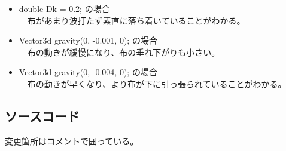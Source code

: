 \documentclass{scrartcl}
\begin{document}
\begin{itemize}
\item double Dk = 0.2; の場合\\
　布があまり波打たず素直に落ち着いていることがわかる。\\

\item Vector3d gravity(0, -0.001, 0); の場合\\
　布の動きが緩慢になり、布の垂れ下がりも小さい。\\

\item Vector3d gravity(0, -0.004, 0); の場合\\
　布の動きが早くなり、より布が下に引っ張られていることがわかる。\\
\end{itemize}


\subsection{ソースコード}
\label{sec:org2b98f13}
変更箇所はコメントで囲っている。\\
\end{document}
